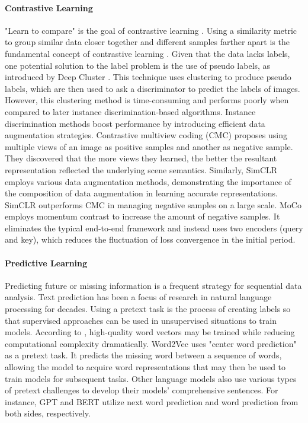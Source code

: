 \documentclass[11pt,titlepage,openright]{book}
\begin{document}
\paragraph{\textbf{Contrastive Learning}} "Learn to compare" is the goal of contrastive learning \citep{gutmann2010noise}. Using a similarity metric to group similar data closer together and different samples farther apart is the fundamental concept of contrastive learning \citep{jaiswal2020survey}. Given that the data lacks labels, one potential solution to the label problem is the use of pseudo labels, as introduced by Deep Cluster \citep{caron2018deep}. This technique uses clustering to produce pseudo labels, which are then used to ask a discriminator to predict the labels of images. However, this clustering method is time-consuming and performs poorly when compared to later instance discrimination-based algorithms. Instance discrimination methods boost performance by introducing efficient data augmentation strategies. Contrastive multiview coding (CMC) \citep{tian2020contrastive} proposes using multiple views of an image as positive samples and another as negative sample. They discovered that the more views they learned, the better the resultant representation reflected the underlying scene semantics. Similarly, SimCLR \citep{chen2020simple} employs various data augmentation methods, demonstrating the importance of the composition of data augmentation in learning accurate representations. SimCLR \citep{chen2020simple} outperforms CMC \citep{tian2020contrastive} in managing negative samples on a large scale. MoCo \citep{he2020momentum} employs momentum contrast to increase the amount of negative samples. It eliminates the typical end-to-end framework and instead uses two encoders (query and key), which reduces the fluctuation of loss convergence in the initial period.

\paragraph{\textbf{Predictive Learning}} Predicting future or missing information is a frequent strategy for sequential data analysis. Text prediction has been a focus of research in natural language processing for decades. Using a pretext task is the process of creating labels so that supervised approaches can be used in unsupervised situations to train models. According to \cite{mikolov2013efficient}, high-quality word vectors may be trained while reducing computational complexity dramatically. Word2Vec \citep{mikolov2013efficient} uses "center word prediction" as a pretext task. It predicts the missing word between a sequence of words, allowing the model to acquire word representations that may then be used to train models for subsequent tasks. Other language models also use various types of pretext challenges to develop their models' comprehensive sentences. For instance, GPT \citep{brown2020language, radford2018improving, radford2019language} and BERT \citep{devlin2018bert} utilize next word prediction and word prediction from both sides, respectively. 
\end{document}
